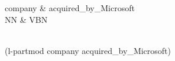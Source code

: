 \documentclass{article}
\begin{document}
\thispagestyle{empty}
\begin{center}
 \begin{dependency}[theme = default]
   \begin{deptext}[column sep=1em]
   company \& acquired\_by\_Microsoft \\
   NN \& VBN  \\
   \end{deptext}
\end{dependency} \\
(l-partmod company acquired\_by\_Microsoft)
\end{center}
\end{document}
